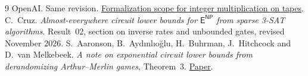 \documentclass[11pt]{article}
\newcommand{\ENP}{\mathsf E^{\mathsf{NP}}}
\begin{document}
\begin{thebibliography}{9}
 OpenAI. Same revision.
\href{https://github.com/openai/math/blob/3344da59991ed94f9ba711217b29c1d760badfa6/lean/docs/379.md}{Formalization scope for integer multiplication on tapes}.
 C.~Cruz. \emph{Almost-everywhere circuit lower bounds
for $\ENP$ from sparse 3-SAT algorithms}. Result~02, section on inverse
rates and unbounded gates, revised November 2026.
 S.~Aaronson, B.~Ayd\i nl\i o\u{g}lu, H.~Buhrman,
J.~Hitchcock and D.~van Melkebeek. \emph{A note on exponential
circuit lower bounds from derandomizing Arthur--Merlin games},
Theorem~3. \href{https://www.cs.uwyo.edu/~jhitchco/papers/neclb.pdf}{Paper}.
\end{thebibliography}
\end{document}
